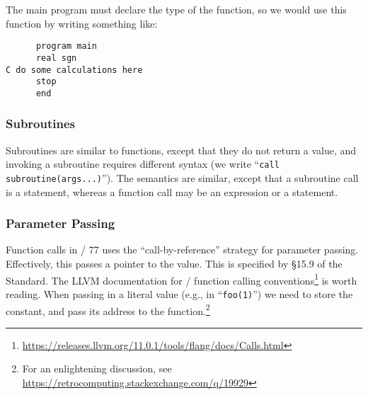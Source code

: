 The main program must declare the type of the function, so we would use
this function by writing something like:
\begin{lstlisting}
      program main
      real sgn
C do some calculations here
      stop
      end
\end{lstlisting}

\subsubsection{Subroutines}
Subroutines are similar to functions, except that they do not return a
value, and invoking a subroutine requires different syntax (we write
``\texttt{call subroutine(args...)}''). The semantics are similar,
except that a subroutine call is a statement, whereas a function call
may be an expression or a statement.

\subsubsection{Parameter Passing}
Function calls in \FORTRAN/ 77 uses the ``call-by-reference'' strategy
for parameter passing. Effectively, this passes a pointer to the value.
This is specified by \S15.9 of the Standard. The LLVM documentation for
\FORTRAN/ function calling
conventions\footnote{\url{https://releases.llvm.org/11.0.1/tools/flang/docs/Calls.html}}
is worth reading. When passing in a literal value (e.g., in ``\texttt{foo(1)}'')
we need to store the constant, and pass its address to the
function.\footnote{For an enlightening discussion, see \url{https://retrocomputing.stackexchange.com/q/19929}}

